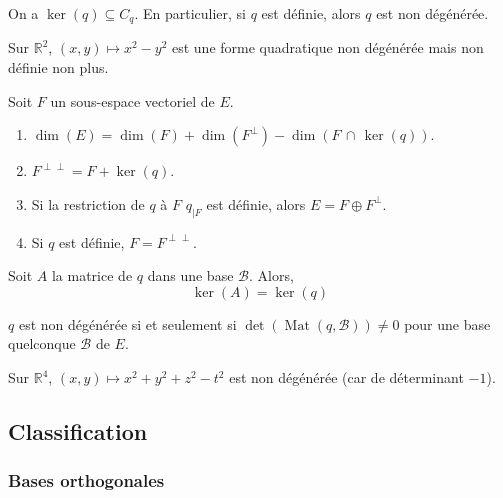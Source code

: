   \begin{proposition}
    On a $\ker(q) \subseteq C_q$. En particulier, si $q$ est définie, alors $q$ est non dégénérée.
  \end{proposition}

  \begin{example}
    Sur $\mathbb{R}^2$, $(x, y) \mapsto x^2 - y^2$ est une forme quadratique non dégénérée mais non définie non plus.
  \end{example}

  \begin{proposition}
    Soit $F$ un sous-espace vectoriel de $E$.
    \begin{enumerate}[label=(\roman*)]
      \item $\dim(E) = \dim(F) + \dim(F^\perp) - \dim(F \, \cap \, \ker(q))$.
      \item $F^{\perp\perp} = F + \ker(q)$.
      \item Si la restriction de $q$ à $F$ $q_{|F}$ est définie, alors $E = F \oplus F^{\perp}$.
      \item Si $q$ est définie, $F = F^{\perp\perp}$.
    \end{enumerate}
  \end{proposition}

  \begin{proposition}
    Soit $A$ la matrice de $q$ dans une base $\mathcal{B}$. Alors,
    \[ \ker(A) = \ker(q) \]
  \end{proposition}


  \begin{corollary}
    $q$ est non dégénérée si et seulement si $\det(\operatorname{Mat}(q, \mathcal{B})) \neq 0$ pour une base quelconque $\mathcal{B}$ de $E$.
  \end{corollary}

  \begin{example}
    Sur $\mathbb{R}^4$, $(x, y) \mapsto x^2 + y^2 + z^2 - t^2$ est non dégénérée (car de déterminant $-1$).
  \end{example}

  \subsection{Classification}

  \subsubsection{Bases orthogonales}

